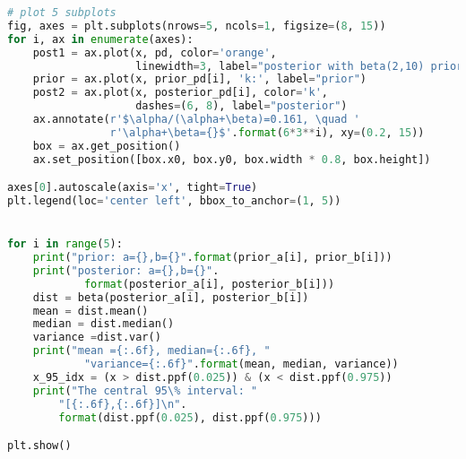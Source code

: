 \documentclass[article,11pt]{article}
\begin{document}
\begin{lstlisting}[language=python]
# plot 5 subplots
fig, axes = plt.subplots(nrows=5, ncols=1, figsize=(8, 15))
for i, ax in enumerate(axes):
	post1 = ax.plot(x, pd, color='orange',
					linewidth=3, label="posterior with beta(2,10) prior")
	prior = ax.plot(x, prior_pd[i], 'k:', label="prior")
	post2 = ax.plot(x, posterior_pd[i], color='k',
					dashes=(6, 8), label="posterior")
	ax.annotate(r'$\alpha/(\alpha+\beta)=0.161, \quad '
				r'\alpha+\beta={}$'.format(6*3**i), xy=(0.2, 15))
	box = ax.get_position()
	ax.set_position([box.x0, box.y0, box.width * 0.8, box.height])

axes[0].autoscale(axis='x', tight=True)
plt.legend(loc='center left', bbox_to_anchor=(1, 5))


for i in range(5):
	print("prior: a={},b={}".format(prior_a[i], prior_b[i]))
	print("posterior: a={},b={}".
			format(posterior_a[i], posterior_b[i]))
	dist = beta(posterior_a[i], posterior_b[i])
	mean = dist.mean()
	median = dist.median()
	variance =dist.var()
	print("mean ={:.6f}, median={:.6f}, "
			"variance={:.6f}".format(mean, median, variance))
	x_95_idx = (x > dist.ppf(0.025)) & (x < dist.ppf(0.975))
	print("The central 95\% interval: "
		"[{:.6f},{:.6f}]\n".
		format(dist.ppf(0.025), dist.ppf(0.975)))

plt.show()

\end{lstlisting}
\end{document}
